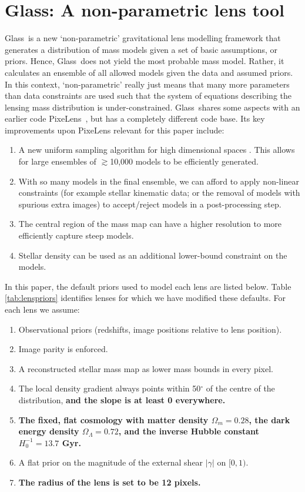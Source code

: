 \documentclass[useAMS,usenatbib]{mn2e}
\def\Glass{{\sc Glass}}
\def\PixeLens{{\sc PixeLens}}
\newcommand{\cb}[1]{{\color{red} \textbf{#1}}}
\begin{document}
\section{\Glass: A non-parametric lens tool}\label{sec:glass}

\Glass\ is a new `non-parametric' gravitational lens modelling framework \citep{2014arXiv1401.7990C} that generates a distribution of mass models given a set of basic assumptions, or priors. Hence, \Glass\ does not yield the most probable mass model. Rather, it calculates an ensemble of all allowed models given the data and assumed priors. In this context, `non-parametric' really just means that many more parameters than data constraints are used such that the system of equations describing the lensing mass distribution is under-constrained. \Glass\ shares some aspects with an earlier code \PixeLens\ \citep{2004AJ....127.2604S,2008ApJ...679...17C}, but has a completely different code base. Its key improvements upon \PixeLens{} relevant for this paper include:

\begin{enumerate}
\item A new uniform sampling algorithm for high dimensional spaces \citep{2012MNRAS.425.3077L}. This allows for large ensembles of $\gtrsim$10,000 models to be efficiently generated. 
\item With so many models in the final ensemble, we can afford to apply non-linear constraints (for example stellar kinematic data; or the removal of models with spurious extra images) to accept/reject models in a post-processing step.
\item The central region of the mass map can have a higher resolution to more efficiently capture steep models.
\item Stellar density can be used as an additional lower-bound constraint on the models. 
\end{enumerate} 

In this paper, the default priors used to model each lens are listed below. Table \ref{tab:lenspriors} identifies lenses for which we have modified these defaults. For each lens we assume:

\begin{enumerate} 
\item Observational priors (redshifts, image positions relative to lens position).
\item Image parity is enforced.
\item A reconstructed stellar mass map as lower mass bounds in every pixel.
\item The local density gradient always points within 50$^{\circ}$ of the centre of the distribution, \cb{and the slope is at least 0 everywhere.}
\item \cb{The fixed, flat cosmology with matter density $\Omega_{m} = 0.28$, the dark energy density $\Omega_{\Lambda} = 0.72$, and the inverse Hubble constant $H_{0}^{-1} = 13.7$ Gyr.}
\item A flat prior on the magnitude of the external shear $|\gamma|$ on $[0,1)$.
\item \cb{The radius of the lens is set to be 12 pixels.}
\end{enumerate}
\end{document}
